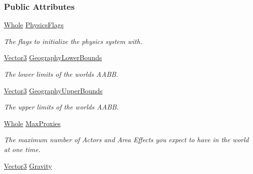 \subsubsection*{Public Attributes}
\begin{DoxyCompactItemize}
\item 
\hypertarget{classphys_1_1PhysicsConstructionInfo_ae477435ddd66f9424f7014463899bcf8}{
\hyperlink{namespacephys_a460f6bc24c8dd347b05e0366ae34f34a}{Whole} \hyperlink{classphys_1_1PhysicsConstructionInfo_ae477435ddd66f9424f7014463899bcf8}{PhysicsFlags}}
\label{classphys_1_1PhysicsConstructionInfo_ae477435ddd66f9424f7014463899bcf8}

\begin{DoxyCompactList}\small\item\em The flags to initialize the physics system with. \item\end{DoxyCompactList}\item 
\hyperlink{classphys_1_1Vector3}{Vector3} \hyperlink{classphys_1_1PhysicsConstructionInfo_ab45b8f19cf4d10351a8ea5ecce56363a}{GeographyLowerBounds}
\begin{DoxyCompactList}\small\item\em The lower limits of the worlds AABB. \item\end{DoxyCompactList}\item 
\hyperlink{classphys_1_1Vector3}{Vector3} \hyperlink{classphys_1_1PhysicsConstructionInfo_aca489cc9e35eeb816ad3d0d069c29688}{GeographyUpperBounds}
\begin{DoxyCompactList}\small\item\em The upper limits of the worlds AABB. \item\end{DoxyCompactList}\item 
\hyperlink{namespacephys_a460f6bc24c8dd347b05e0366ae34f34a}{Whole} \hyperlink{classphys_1_1PhysicsConstructionInfo_aae25b797d7ea11b812bc3433c38f554a}{MaxProxies}
\begin{DoxyCompactList}\small\item\em The maximum number of Actors and Area Effects you expect to have in the world at one time. \item\end{DoxyCompactList}\item 
\hypertarget{classphys_1_1PhysicsConstructionInfo_a213ced8debbdd59a2a489298f292182c}{
\hyperlink{classphys_1_1Vector3}{Vector3} \hyperlink{classphys_1_1PhysicsConstructionInfo_a213ced8debbdd59a2a489298f292182c}{Gravity}}
\label{classphys_1_1PhysicsConstructionInfo_a213ced8debbdd59a2a489298f292182c}


\end{DoxyCompactItemize}
